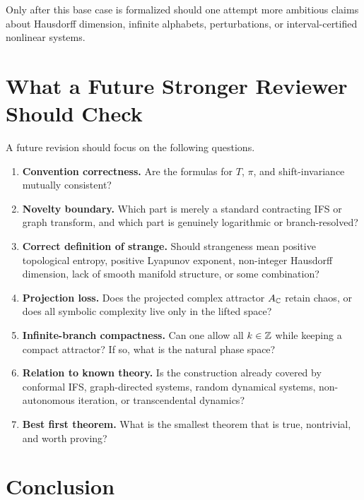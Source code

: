 	Only after this base case is formalized should one attempt more ambitious claims about Hausdorff dimension, infinite alphabets, perturbations, or interval-certified nonlinear systems.
	
	\section{What a Future Stronger Reviewer Should Check}
	
	A future revision should focus on the following questions.
	
	\begin{enumerate}
		\item \textbf{Convention correctness.}
		Are the formulas for \(T\), \(\pi\), and shift-invariance mutually consistent?
		
		\item \textbf{Novelty boundary.}
		Which part is merely a standard contracting IFS or graph transform, and which part is genuinely logarithmic or branch-resolved?
		
		\item \textbf{Correct definition of strange.}
		Should strangeness mean positive topological entropy, positive Lyapunov exponent, non-integer Hausdorff dimension, lack of smooth manifold structure, or some combination?
		
		\item \textbf{Projection loss.}
		Does the projected complex attractor \(A_{\mathbb{C}}\) retain chaos, or does all symbolic complexity live only in the lifted space?
		
		\item \textbf{Infinite-branch compactness.}
		Can one allow all \(k\in\mathbb{Z}\) while keeping a compact attractor? If so, what is the natural phase space?
		
		\item \textbf{Relation to known theory.}
		Is the construction already covered by conformal IFS, graph-directed systems, random dynamical systems, non-autonomous iteration, or transcendental dynamics?
		
		\item \textbf{Best first theorem.}
		What is the smallest theorem that is true, nontrivial, and worth proving?
	\end{enumerate}
	
	\section{Conclusion}
	
